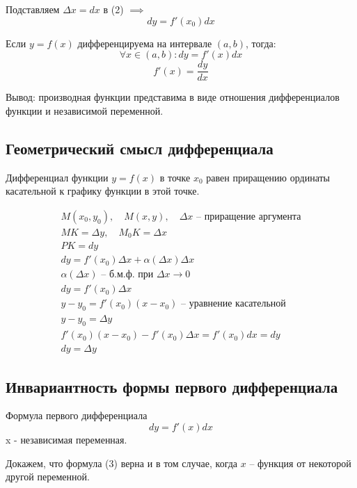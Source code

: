 Подставляем $\Delta x = dx$ в (2) $\implies$ \[
  \boxed{dy = f'(x_0) dx} \tag{3}
\] 

Если $y = f(x)$ дифференцируема на интервале  $(a, b)$, тогда:  \[
  \forall x \in (a, b): \boxed{dy = f'(x) dx} \tag{4}
\] 
\[
  \boxed{f'(x) = \frac{dy}{dx}} \tag{5}
\]

Вывод: производная функции представима в виде отношения дифференциалов функции и независимой переменной.

\subsection{Геометрический смысл дифференциала}

Дифференциал функции $y = f(x)$ в точке $x_0$ равен приращению ординаты касательной к графику функции в этой точке.

\begin{gather*}
  M(x_0, y_0), \quad M(x, y), \quad \Delta x \text{ -- приращение аргумента} \\
  MK = \Delta y, \quad M_0K = \Delta x \\
  PK = dy \\
  dy = f'(x_0) \Delta x + \alpha(\Delta x) \Delta x \\
  \alpha(\Delta x) \text{ -- б.м.ф. при } \Delta x \to  0 \\
  dy = f'(x_0) \Delta x \\
  \boxed{y - y_0 = f'(x_0)(x - x_0)} \text{ -- уравнение касательной} \\
  y - y_0 = \Delta y \\
  f'(x_0)(x - x_0) - f'(x_0) \Delta x = f'(x_0) dx = dy \\
  dy = \Delta y
\end{gather*}

\subsection{Инвариантность формы первого дифференциала}

Формула первого дифференциала \[
  \boxed{dy = f'(x)dx} \tag{3}
\] 
x - независимая переменная.

Докажем, что формула (3) верна и в  том случае, когда $x$ -- функция от некоторой другой переменной.

